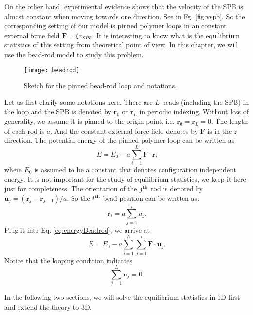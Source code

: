 On the other hand, experimental evidence shows that the velocity of the SPB is almost constant when moving towards one direction. See in Fg. \ref{fig:vspb}. So the corresponding setting of our model is pinned polymer loops in an constant external force field $\mathbf{F}=\xi v_{SPB}$. It is interesting to know what is the equilibrium statistics of this setting from theoretical point of view. In this chapter, we will use the bead-rod model to study this problem. 
\begin{figure}[htpb]
    \centering
    \texttt{[image: beadrod]}
    \caption{Sketch for the pinned bead-rod loop and notations. }
    \label{fig:beadrod}
\end{figure}

Let us first clarify some notations here. There are $L$ beads (including the SPB) in the loop and the SPB is denoted by $\mathbf{r}_0$ or $\mathbf{r}_L$ in periodic indexing. Without loss of generality, we assume it is pinned to the origin point, i.e. $\mathbf{r}_0 = \mathbf{r}_L = 0$. The length of each rod is $a$. And the constant external force field denotes by $\mathbf{F}$ is in the $z$ direction. The potential energy of the pinned polymer loop can be written as:
\begin{equation}
    \label{eq:energyBeadrod}
    E = E_0 - a\sum_{i=1}^{L} \mathbf{F}\cdot\mathbf{r}_i
\end{equation}
where $E_0$ is assumed to be a constant that denotes configuration independent energy. It is not important for the study of equilibrium statistics, we keep it here just for completeness. The orientation of the $j^{\rm{th}}$ rod is denoted by $\mathbf{u}_j = (\mathbf{r}_{j}-\mathbf{r}_{j-1})/a$. So the $i^{\rm{th}}$ bead position can be written as:
\begin{equation}
    \label{eq:beadposRodsum}
    \mathbf{r}_i = a \sum_{j=1}^{i} {u}_j.
\end{equation}
Plug it into Eq. \eqref{eq:energyBeadrod}, we arrive at
\begin{equation}
    \label{eq:energyRodsum}
    E = E_0-a\sum_{i=1}^{L}\sum_{j=1}^{i}\mathbf{F}\cdot\mathbf{u}_j.
\end{equation}
Notice that the looping condition indicates
\begin{equation}
    \label{eq:loopCondition}
    \sum_{j=1}^{L} \mathbf{u}_j = 0.
\end{equation}

In the following two sections, we will solve the equilibrium statistics in 1D first and extend the theory to 3D.


